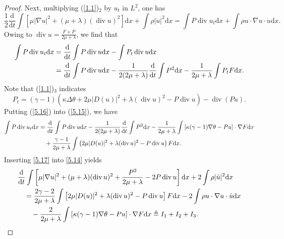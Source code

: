\documentclass[11pt]{article}
\DeclareMathOperator{\divv}{div}
\begin{document}
\begin{proof}
Next, multiplying (\ref{1.1})$_2$ by $u_t$ in $L^2$, one has
\begin{equation}\label{5.14}
\frac{1}{2} \frac{\mathrm{d}}{\mathrm{d} t} \int \left[ \mu |\nabla u|^2 + (\mu + \lambda )(\divv u)^2 \right] \mathrm{d} x + \int \rho |\dot{u}|^2 \mathrm{d} x = \int P \divv u_t \mathrm{d} x + \int \rho u \cdot \nabla u \cdot \dot{u} \mathrm{d} x.
\end{equation}
Owing to $\divv u = \frac{F + P }{2 \mu + \lambda }$, we find that
\begin{align}
\int P \divv u_t \mathrm{d} x
& = \frac{\mathrm{d}}{\mathrm{d} t} \int P \divv u \mathrm{d} x - \int P_t \divv u \mathrm{d} x\notag\\
& = \frac{\mathrm{d}}{\mathrm{d} t} \int P \divv u \mathrm{d} x - \frac{1}{2 (2 \mu + \lambda )} \frac{\mathrm{d}}{\mathrm{d} t} \int P^2 \mathrm{d} x - \frac{1}{2\mu + \lambda } \int P_t F \mathrm{d} x.\label{5.15}
\end{align}
Note that (\ref{1.1})$_3$ indicates
\begin{equation}\label{5.16}
P_t = (\gamma - 1) \left(\kappa \Delta \theta + 2 \mu |D(u)|^2 + \lambda(\divv u)^2 - P\divv u\right) - \divv(P u).
\end{equation}
Putting (\ref{5.16}) into (\ref{5.15}), we have
\begin{align}
\int P \divv u_t \mathrm{d} x
& = \frac{\mathrm{d}}{\mathrm{d} t} \int P \divv u \mathrm{d} x - \frac{1}{2 (2 \mu + \lambda )} \frac{\mathrm{d}}{\mathrm{d} t} \int P^2 \mathrm{d} x - \frac{1}{2\mu + \lambda } \int \left[ \kappa (\gamma - 1) \nabla \theta - P u \right] \cdot \nabla F \mathrm{d} x\notag\\
& \quad + \frac{\gamma - 1}{2 \mu + \lambda } \int \left(2 \mu |D(u)|^2 + \lambda(\divv u)^2 - P \divv u \right) F \mathrm{d} x.\label{5.17}
\end{align}
Inserting \eqref{5.17} into \eqref{5.14} yields
\begin{align}
& \frac{\mathrm{d}}{\mathrm{d} t} \int \left[ \mu |\nabla u|^2 + (\mu + \lambda ) (\divv u)^2 + \frac{P^2}{2\mu + \lambda } - 2 P \divv u \right] \mathrm{d} x + 2 \int \rho |\dot{u}|^2 \mathrm{d} x\notag\\
& \quad = \frac{2\gamma - 2}{2 \mu + \lambda } \int \left[2 \mu |D(u)|^2 + \lambda(\divv u)^2 - P \divv u \right] F \mathrm{d} x - 2 \int \rho u \cdot \nabla u \cdot \dot{u} \mathrm{d} x\notag\\
& \qquad - \frac{2}{2\mu + \lambda } \int \left[ \kappa (\gamma - 1) \nabla \theta - P u \right] \cdot \nabla F \mathrm{d} x \triangleq I_1 + I_2 + I_3.\label{5.18}
\end{align}


\end{proof}
\end{document}
